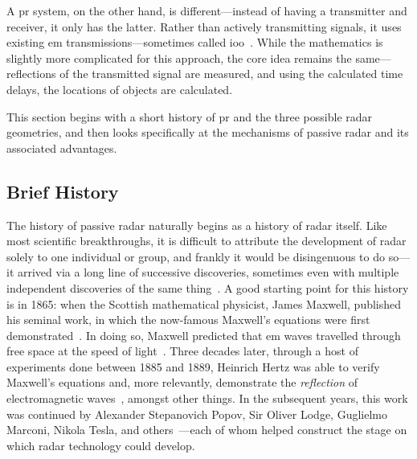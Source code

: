 \documentclass[class=report,11pt,crop=false]{standalone}
\begin{document}
A \gls{pr} system, on the other hand, is different---instead of having a transmitter and receiver, it only has the latter. Rather than actively transmitting signals, it uses existing \gls{em} transmissions---sometimes called \gls{ioo}~\cite{Griffiths1992}. While the mathematics is slightly more complicated for this approach, the core idea remains the same---reflections of the transmitted signal are measured, and using the calculated time delays, the locations of objects are calculated.

This section begins with a short history of \gls{pr} and the three possible radar geometries, and then looks specifically at the mechanisms of passive radar and its associated advantages.

\subsection{Brief History}
The history of passive radar naturally begins as a history of radar itself. Like most scientific breakthroughs, it is difficult to attribute the development of radar solely to one individual or group, and frankly it would be disingenuous to do so---it arrived via a long line of successive discoveries, sometimes even with multiple independent discoveries of the same thing~\cite{brown1999technical}. A good starting point for this history is in 1865: when the Scottish mathematical physicist, James Maxwell, published his seminal work, in which the now-famous Maxwell's equations were first demonstrated~\cite{maxwell1865viii}. In doing so, Maxwell predicted that \gls{em} waves travelled through free space at the speed of light~\cite{Sengupta2003}. Three decades later, through a host of experiments done between 1885 and 1889, Heinrich Hertz was able to verify Maxwell's equations and, more relevantly, demonstrate the \emph{reflection} of electromagnetic waves~\cite{hertz1893electromagnetic, Cichon1995}, amongst other things. In the subsequent years, this work was continued by Alexander Stepanovich Popov, Sir Oliver Lodge, Guglielmo Marconi, Nikola Tesla, and others~\cite{Rohling2014, James1989, Griffiths2019}---each of whom helped construct the stage on which radar technology could develop.
\end{document}
